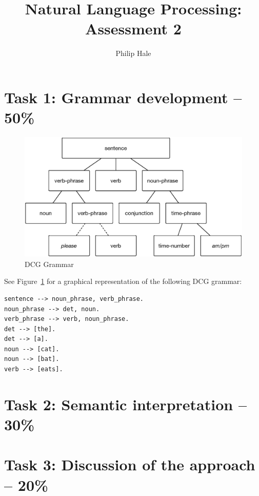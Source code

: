 \documentclass{article}
\author{Philip Hale}
\title{Natural Language Processing: Assessment 2}
\begin{document}
\maketitle

\section{Task 1: Grammar development – 50\%}

\begin{figure}
  \centering
  \includegraphics[width=\textwidth]{dcg_grammar.eps}
  \caption{DCG Grammar}
  \label{fig:dcg_grammar}
\end{figure}

See Figure~\ref{fig:dcg_grammar} for a graphical representation of the following
DCG grammar:

\begin{verbatim}
sentence --> noun_phrase, verb_phrase.
noun_phrase --> det, noun.
verb_phrase --> verb, noun_phrase.
det --> [the].
det --> [a].
noun --> [cat].
noun --> [bat].
verb --> [eats].
\end{verbatim}




\section{Task 2: Semantic interpretation – 30\%}

\section{Task 3: Discussion of the approach – 20\%}
\end{document}

